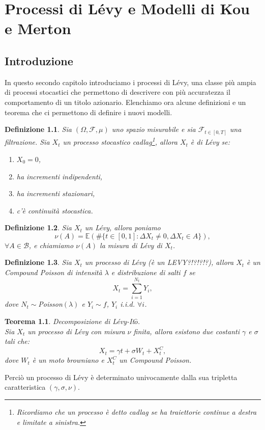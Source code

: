 \documentclass[a4paper,10pt]{report}
\newtheorem{definition}{Definizione}[chapter]
\newtheorem{theorem}{Teorema}[chapter]
\theoremstyle{osservazione}
\theoremstyle{esempio}
\theoremstyle{notazione}
\theoremstyle{corollario}
\begin{document}
\chapter{Processi di L\'evy e Modelli di Kou e Merton}
\section{Introduzione}
In questo secondo capitolo introduciamo i processi di L\'evy, una classe pi\`u ampia di processi stocastici che permettono di descrivere con pi\`u accuratezza il comportamento di un titolo azionario. Elenchiamo ora alcune definizioni e un teorema che ci permettono di definire i nuovi modelli.
\begin{definition}
Sia $(\Omega, \mathcal{F}, \mu)$ uno spazio misurabile e sia $\mathcal{F}_{t\in[0,T]}$ una filtrazione. Sia $X_t$ un processo stocastico \emph{cadlag}\footnote{Ricordiamo che un processo \`e detto \emph{cadlag} se ha traiettorie continue a destra e limitate a sinistra.}, allora $X_t$ \`e di L\'evy se:
\begin{enumerate}
\item $X_0=0$,
\item ha incrementi indipendenti,
\item ha incrementi stazionari,
\item c'\`e continuit\`a stocastica.
\end{enumerate}
\end{definition}
\begin{definition}
Sia $X_t$ un L\'evy, allora poniamo $$\nu(A)=\mathbb{E}(\#\{t\in[0,1]: \Delta X_t\neq0, \Delta X_t\in A\}),$$ $\forall A\in \mathcal{B}$, e chiamiamo $\nu(A)$ la misura di L\'evy di $X_t$.
\end{definition}
\begin{definition}
Sia $X_t$ un processo di L\'evy (\`e un LEVY?!?!?!?), allora $X_t$ \`e un \emph{Compound Poisson} di intensit\`a $\lambda$ e distribuzione di salti $f$ se $$X_t=\sum_{i=1}^{N_t}Y_i,$$ dove $N_t\sim$\emph{Poisson}$(\lambda)$ e $Y_i\sim f$, $Y_i$ i.i.d. $\forall i$.
\end{definition}
\begin{theorem}
Decomposizione di L\'evy-It$\hat{o}$.\\Sia $X_t$ un processo di L\'evy con misura $\nu$ finita, allora esistono due costanti $\gamma$ e $\sigma$ tali che:$$X_t=\gamma t+\sigma W_t+X^C_t,$$ dove $W_t$ \`e un moto browniano e $X^C_t$ un \emph{Compound Poisson}.
\end{theorem}
Perci\`o un processo di L\'evy \`e determinato univocamente dalla sua tripletta caratteristica $(\gamma, \sigma, \nu)$.
\end{document}
